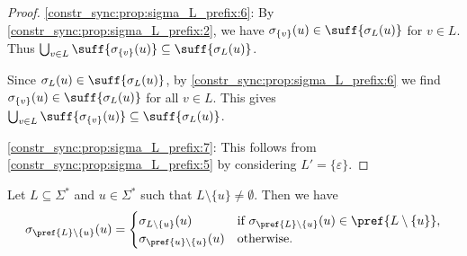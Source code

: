 \begin{proof}
\ref{constr_sync:prop:sigma_L_prefix:6}: By \cref{constr_sync:prop:sigma_L_prefix:2}, we have $\sigma_{\{v\}}(u) \in \suff{\sigma_L(u)}$ for $v \in L$.
 Thus $\bigcup_{v \in L} \suff{\sigma_{\{v\}}(u)} \subseteq \suff{\sigma_L(u)}$.
 
 Since $\sigma_L(u) \in \suff{\sigma_L(u)}$,
 by \cref{constr_sync:prop:sigma_L_prefix:6} we find $\sigma_{\{v\}}(u) \in \suff{\sigma_L(u)}$
 for all $v \in L$. This gives $\bigcup_{v \in L} \suff{\sigma_{\{v\}}(u)} \subseteq \suff{\sigma_L(u)}$.
 
\ref{constr_sync:prop:sigma_L_prefix:7}: This follows from \cref{constr_sync:prop:sigma_L_prefix:5} 
by considering $L' = \{\varepsilon\}$.
\end{proof}

\begin{proposition}
	Let $L \subseteq \Sigma^*$ and $u \in \Sigma^*$ such that $L \setminus\{u\} \ne \emptyset$.
	Then we have 
	\begin{equation}\label{constrsync:eqn:sigma_prefL}
		\sigma_{\pref{L} \setminus \{u\}}(u) 
		=
		\begin{cases}
			\sigma_{L\setminus \{u\}}(u) & \text{if } \sigma_{\pref{L}\setminus \{u\}}(u) \in \pref{L \setminus \{u\}}, \\
			\sigma_{\pref{u}\setminus\{u\}}(u) & \text{otherwise.}
		\end{cases}
	\end{equation}
\end{proposition}
